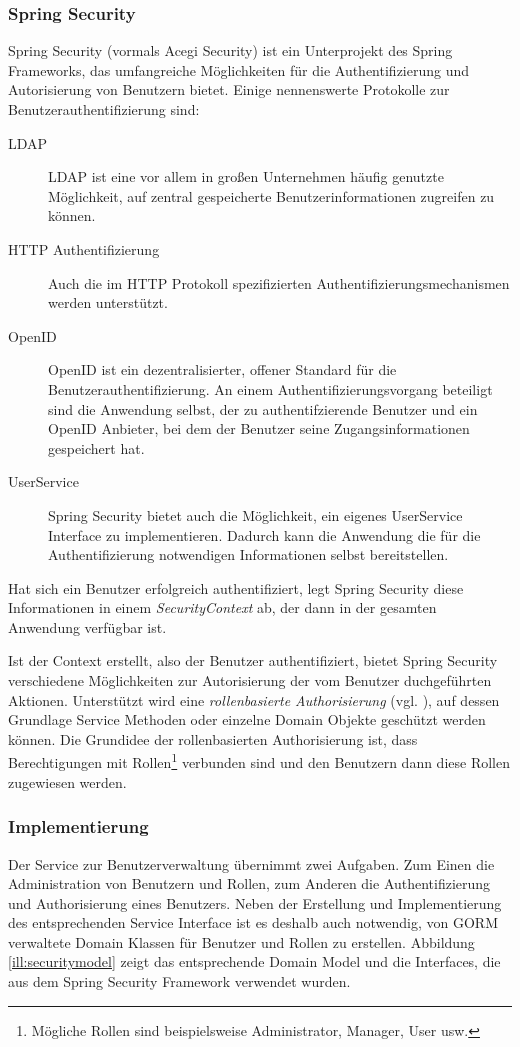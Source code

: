 \subsubsection{Spring Security}
Spring Security (vormals Acegi Security) ist ein Unterprojekt des Spring
Frameworks, das umfangreiche Möglichkeiten für die Authentifizierung
und Autorisierung von Benutzern bietet. Einige nennenswerte
Protokolle zur Benutzerauthentifizierung sind:

\begin{description}
	\item[LDAP] LDAP ist eine vor allem in großen Unternehmen häufig genutzte
	Möglichkeit, auf zentral gespeicherte Benutzerinformationen zugreifen zu
	können.
	\item[HTTP Authentifizierung] Auch die im \ac{HTTP} Protokoll
	spezifizierten Authentifizierungsmechanismen werden unterstützt.
	\item[OpenID] OpenID ist ein dezentralisierter, offener Standard für die
	Benutzerauthentifizierung. An einem Authentifizierungsvorgang beteiligt sind
	die Anwendung selbst, der zu authentifzierende Benutzer und ein OpenID
	Anbieter, bei dem der Benutzer seine Zugangsinformationen gespeichert hat.
	\item[UserService] Spring Security bietet auch die Möglichkeit, ein
	eigenes UserService Interface zu implementieren. Dadurch kann die Anwendung
	die für die Authentifizierung notwendigen Informationen selbst bereitstellen.
\end{description}

Hat sich ein Benutzer erfolgreich authentifiziert, legt Spring Security diese
Informationen in einem \emph{SecurityContext} ab, der dann in der gesamten
Anwendung verfügbar ist.

Ist der Context erstellt, also der Benutzer authentifiziert, bietet Spring
Security verschiedene Möglichkeiten zur Autorisierung der vom Benutzer
duchgeführten Aktionen. Unterstützt wird eine \emph{rollenbasierte
Authorisierung} (vgl. \cite{park:2001}), auf dessen Grundlage Service
Methoden oder einzelne Domain Objekte geschützt werden können. Die Grundidee der
rollenbasierten Authorisierung ist, dass Berechtigungen mit
Rollen\footnote{Mögliche Rollen sind beispielsweise Administrator, Manager, User
usw.} verbunden sind und den Benutzern dann diese Rollen zugewiesen werden.

\subsubsection{Implementierung}
Der Service zur Benutzerverwaltung übernimmt zwei Aufgaben. Zum Einen
die Administration von Benutzern und Rollen, zum Anderen die
Authentifizierung und Authorisierung eines Benutzers. Neben der Erstellung und
Implementierung des entsprechenden Service Interface ist es deshalb auch
notwendig, von \ac{GORM} verwaltete Domain Klassen für Benutzer und Rollen zu
erstellen. Abbildung \ref{ill:securitymodel} zeigt das entsprechende Domain
Model und die Interfaces, die aus dem Spring Security Framework verwendet
wurden.

